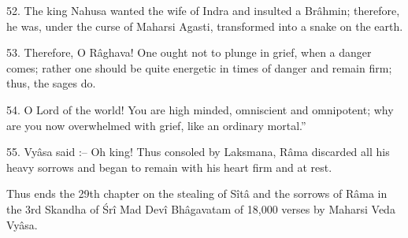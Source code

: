 52. The king Nahusa wanted the wife of Indra and insulted a Br\^ahmin; therefore, he was, under the curse of Maharsi Agasti, transformed into a snake on the earth.

53. Therefore, O R\^aghava! One ought not to plunge in grief, when a danger comes; rather one should be quite energetic in times of danger and remain firm; thus, the sages do.

54. O Lord of the world! You are high minded, omniscient and omnipotent; why are you now overwhelmed with grief, like an ordinary mortal.''

55. Vy\^asa said :-- Oh king! Thus consoled by Laksmana, R\^ama discarded all his heavy sorrows and began to remain with his heart firm and at rest.

Thus ends the 29th chapter on the stealing of S\^it\^a and the sorrows of R\^ama in the 3rd Skandha of \'Sr\^i Mad Dev\^i Bh\^agavatam of 18,000 verses by Maharsi Veda Vy\^asa.